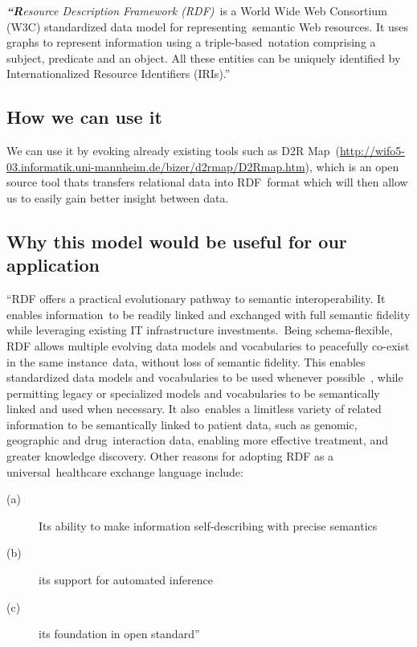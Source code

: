 \documentclass[DIV=calc, paper=a4, fontsize=12pt, onecolumn]{scrartcl}	 %
\newcommand{\initial}[1]{ %
\lettrine[lines=3,lhang=0.3,nindent=0em,slope=0em]{
\color{DarkBlue}
{\textbf{\textit{#1}}}}{}}
\begin{document}
\initial{``R}\textit{esource Description Framework (RDF)}\
is a World Wide Web Consortium (W3C) standardized data model for representing\
semantic Web resources. It uses graphs to represent information using a triple-based\
 notation comprising a subject, predicate and an object. All these entities can be uniquely identified by Internationalized Resource Identifiers (IRIs).''\
  \citep{pathak_applying_2012}

\subsection{How we can use it}

We can use it by evoking already existing tools such as D2R Map\
  (\url{http://wifo5-03.informatik.uni-mannheim.de/bizer/d2rmap/D2Rmap.htm}),
 which is an open source tool thats transfers relational data into RDF\
 format which will then allow us to easily gain better insight between data.\

\subsection{Why this model would be useful for our application}

``RDF offers a practical evolutionary pathway to semantic interoperability. It enables information\
 to be readily linked and exchanged with full semantic fidelity while leveraging existing IT infrastructure investments.\
 Being schema-flexible, RDF allows multiple evolving data models and vocabularies to peacefully co-exist in the same instance\
data, without loss of semantic fidelity. This enables standardized data models and vocabularies to be used whenever possible\
, while permitting legacy or specialized models and vocabularies to be semantically linked and used when necessary. It also\
 enables a limitless variety of related information to be semantically linked to patient data, such as genomic, geographic and drug\
 interaction data, enabling more effective treatment, and greater knowledge discovery. Other reasons for adopting RDF as a universal\
 healthcare exchange language include:

\begin{description}
\item[(a)]  Its ability to make information self-describing with precise semantics
\item[(b)] its support for automated inference
\item[(c)]  its foundation in open standard''
\end{description}
\end{document}
